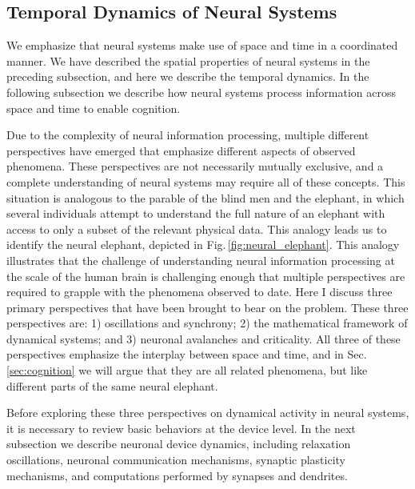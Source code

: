 \subsection{Temporal Dynamics of Neural Systems}
We emphasize that neural systems make use of space and time in a coordinated manner. We have described the spatial properties of neural systems in the preceding subsection, and here we describe the temporal dynamics. In the following subsection we describe how neural systems process information across space and time to enable cognition. 

Due to the complexity of neural information processing, multiple different perspectives have emerged that emphasize different aspects of observed phenomena. These perspectives are not necessarily mutually exclusive, and a complete understanding of neural systems may require all of these concepts. This situation is analogous to the parable of the blind men and the elephant, in which several individuals attempt to understand the full nature of an elephant with access to only a subset of the relevant physical data. This analogy leads us to identify the neural elephant, depicted in Fig.\,\ref{fig:neural_elephant}. This analogy illustrates that the challenge of understanding neural information processing at the scale of the human brain is challenging enough that multiple perspectives are required to grapple with the phenomena observed to date. Here I discuss three primary perspectives that have been brought to bear on the problem. These three perspectives are: 1) oscillations and synchrony; 2) the mathematical framework of dynamical systems; and 3) neuronal avalanches and criticality. All three of these perspectives emphasize the interplay between space and time, and in Sec.\,\ref{sec:cognition} we will argue that they are all related phenomena, but like different parts of the same neural elephant.

Before exploring these three perspectives on dynamical activity in neural systems, it is necessary to review basic behaviors at the device level. In the next subsection we describe neuronal device dynamics, including relaxation oscillations, neuronal communication mechanisms, synaptic plasticity mechanisms, and computations performed by synapses and dendrites. 

